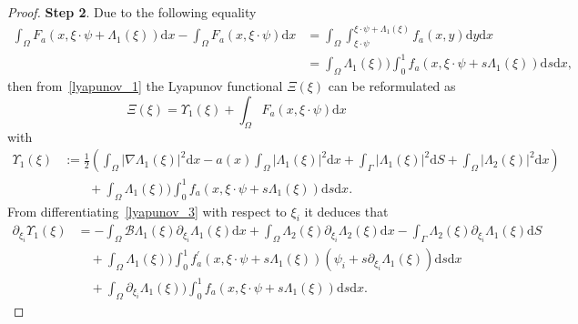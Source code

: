 \documentclass{elsarticle}
\begin{document}
\begin{proof}
\textbf{Step 2}. Due to the following equality
\begin{equation*}
\begin{split}
 \int_{\Omega}F_a(x, \xi\cdot\psi + \Lambda_1(\xi))\mathrm{d}x -\int_{\Omega}F_a(x, \xi\cdot\psi)\mathrm{d}x &=  \int_{\Omega}\int_{\xi\cdot\psi}^{\xi\cdot\psi + \Lambda_1(\xi)}f_a(x, y)\mathrm{d}y\mathrm{d}x\\
 &=\int_{\Omega}\Lambda_1(\xi))\int^{1}_{0}f_a(x, \xi\cdot\psi + s\Lambda_1(\xi))\mathrm{d}s\mathrm{d}x,	
\end{split}
\end{equation*}
then from~\eqref{lyapunov_1} the Lyapunov functional $\Xi(\xi)$ can be reformulated as
\begin{equation*}
\Xi(\xi) =  \Upsilon_1(\xi) +  \int_{\Omega}F_a(x, \xi\cdot\psi)\mathrm{d}x
\end{equation*}
with
\begin{equation}\label{lyapunov_3}
\begin{split}
\Upsilon_1(\xi) &:= \frac{1}{2}\left(\int_{\Omega}|\nabla  \Lambda_1(\xi)|^2\mathrm{d}x - a(x)\int_{\Omega}|  \Lambda_1(\xi)|^2\mathrm{d}x + \int_{\Gamma}|\Lambda_1(\xi)|^2\mathrm{d}S + \int_{\Omega}|\Lambda_2(\xi)|^2\mathrm{d}x\right) \\
&\qquad + \int_{\Omega}\Lambda_1(\xi))\int^{1}_{0}f_a(x, \xi\cdot\psi + s\Lambda_1(\xi))\mathrm{d}s\mathrm{d}x. 
\end{split}
\end{equation}
From differentiating~\eqref{lyapunov_3} with respect to $\xi_i$ it deduces that
\begin{equation}\label{diff_lyapunov_3}
\begin{split}
\partial_{\xi_i}\Upsilon_1(\xi) &=  -\int_{\Omega}\mathcal{B}\Lambda_1(\xi)\partial_{\xi_i}\Lambda_1(\xi)\mathrm{d}x + \int_{\Omega}\Lambda_2(\xi)\partial_{\xi_i}\Lambda_2(\xi)\mathrm{d}x-\int_{\Gamma} \Lambda_2(\xi)\partial_{\xi_i}\Lambda_1(\xi)\mathrm{d}S\\
&\quad + \int_{\Omega}\Lambda_1(\xi))\int^{1}_{0} f^{\prime}_a(x, \xi\cdot\psi + s\Lambda_1(\xi))(\psi_i + s\partial_{\xi_i}\Lambda_1(\xi))\mathrm{d}s\mathrm{d}x\\
&\quad + \int_{\Omega}\partial_{\xi_i}\Lambda_1(\xi))\int^{1}_{0}f_a(x, \xi\cdot\psi + s\Lambda_1(\xi))\mathrm{d}s\mathrm{d}x.
\end{split}
\end{equation}


\end{proof}
\end{document}
